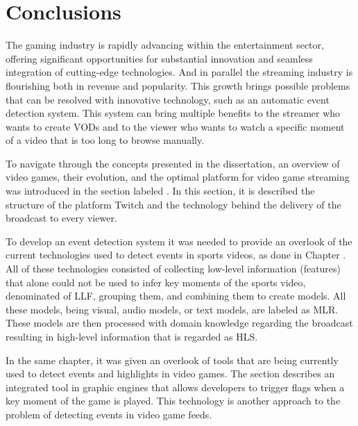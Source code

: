 
%

\chapter{Conclusions}

    The gaming industry is rapidly advancing within the entertainment sector, offering significant opportunities for substantial innovation and seamless integration of cutting-edge technologies. And in parallel the streaming industry is flourishing both in revenue and popularity. This growth brings possible problems that can be resolved with innovative technology, such as an automatic event detection system. This system can bring multiple benefits to the streamer who wants to create \gls{VOD}s and to the viewer who wants to watch a specific moment of a video that is too long to browse manually.

    To navigate through the concepts presented in the dissertation, an overview of video games, their evolution, and the optimal platform for video game streaming was introduced in the section labeled . In this section, it is described the structure of the platform Twitch and the technology behind the delivery of the broadcast to every viewer.

    To develop an event detection system it was needed to provide an overlook of the current technologies used to detect events in sports videos, as done in Chapter . All of these technologies consisted of collecting low-level information (features) that alone could not be used to infer key moments of the sports video, denominated of \gls{LLF}, grouping them, and combining them to create models. All these models, being visual, audio models, or text models, are labeled as \gls{MLR}. These models are then processed with domain knowledge regarding the broadcast resulting in high-level information that is regarded as \gls{HLS}.

    In the same chapter, it was given an overlook of tools that are being currently used to detect events and highlights in video games. The section  describes an integrated tool in graphic engines that allows developers to trigger flags when a key moment of the game is played. This technology is another approach to the problem of detecting events in video game feeds.

